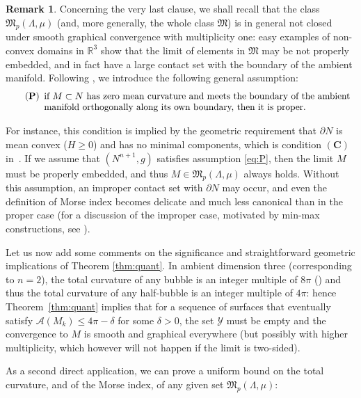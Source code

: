 \documentclass[10pt]{amsart}
\let\mathcal\mathscr
\newcounter{cas}
\theoremstyle{definition}
\newtheorem{rmk}[thm]{Remark}
\newcommand{\R}{\mathbb{R}}
\begin{document}
\begin{rmk}\label{rem:properness}
Concerning the very last clause, we shall recall that the class $\mathfrak{M}_p(\Lambda,\mu)$ (and, more generally, the whole class $\mathfrak{M}$) is in general not closed under smooth graphical convergence with multiplicity one: easy examples of non-convex domains in $\R^3$ show that the limit of elements in $\mathfrak{M}$ may be not properly embedded, and in fact have a large contact set with the boundary of the ambient manifold. Following \cite{ACS17}, we introduce the following general assumption:
\begin{equation}
\tag{\textbf{P}}\label{eq:P}
\begin{array}[t]{l}
\text{if $M\subset N$ has zero mean curvature and meets the boundary of the ambient}\\
\text{manifold orthogonally along its own boundary, then it is proper.}
\end{array}
\end{equation}

For instance, this condition is implied by the geometric requirement that $\partial N$ is mean convex (\ie $H\geq 0$) and has no minimal components, which is condition $(\textbf{C})$ in~\cite{ACS17}.
If we assume that $(N^{n+1},g)$ satisfies assumption \eqref{eq:P}, then the limit $M$ must be properly embedded, and thus $M\in\mathfrak{M}_{p}(\Lambda,\mu)$ always holds. Without this assumption, an improper contact set with $\partial N$ may occur, and even the definition of Morse index becomes delicate and much less canonical than in the proper case (for a discussion of the improper case, motivated by min-max constructions, see \cite{GZ18}).
\end{rmk}

Let us now add some comments on the significance and straightforward geometric implications of Theorem \ref{thm:quant}.
In ambient dimension three (corresponding to $n=2$), the total curvature of any bubble is an integer multiple of $8\pi$ (\cf \cite{Oss63, Oss64}) and thus the total curvature of any half-bubble is an integer multiple of $4\pi$: hence Theorem~\ref{thm:quant} implies that for a sequence of surfaces that eventually satisfy $\mathcal{A}(M_k)\leq 4\pi-\delta$ for some $\delta>0$, the set $\mathcal{Y}$ must be empty and the convergence to $M$ is smooth and graphical everywhere (but possibly with higher multiplicity, which however will not happen if the limit is two-sided). 

As a second direct application, we can prove a uniform bound on the total curvature, and of the Morse index, of any given set $\mathfrak{M}_p(\Lambda,\mu)$:
\end{document}
